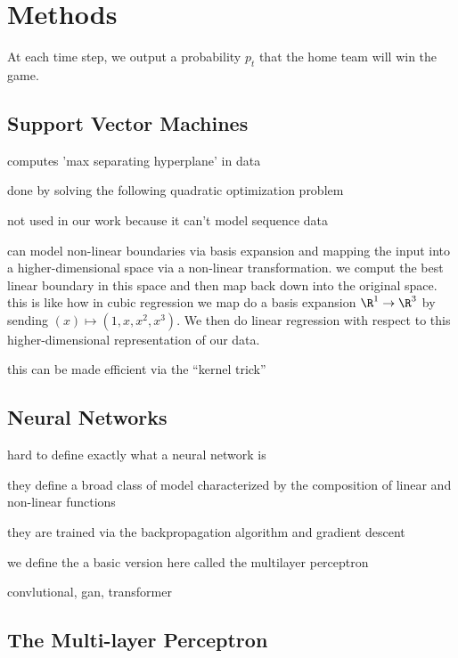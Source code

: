 \section{Methods}

At each time step, we output a probability $p_t$ that the home team will win the game.

\subsection{Support Vector Machines}


computes 'max separating hyperplane' in data

done by solving the following quadratic optimization problem
\begin{equation}
\end{equation}

not used in our work because it can't model sequence data

can model non-linear boundaries via basis expansion and mapping the input into a higher-dimensional space via a non-linear transformation. we comput the best linear boundary in this space and then map back down into the original space. this is like how in cubic regression we map do a basis expansion  $\R^1 \to \R^3$ by sending $(x) \mapsto (1, x, x^2, x^3)$. We then do linear regression with respect to this higher-dimensional representation of our data.

this can be made efficient via the ``kernel trick''

\subsection{Neural Networks}

hard to define exactly what a neural network is

they define a broad class of model characterized by the composition of linear and non-linear functions

they are trained via the backpropagation algorithm and gradient descent

we define the a basic version here called the multilayer perceptron

convlutional, gan, transformer

\subsection{The Multi-layer Perceptron}

